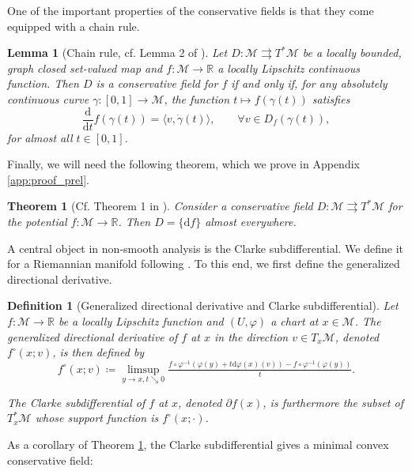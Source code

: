 \documentclass{article}
\newtheorem{definition}{Definition}
\newtheorem{lemma}{Lemma}
\newtheorem{theorem}{Theorem}
\newcommand{\CM}{\mathcal{M}}
\newcommand{\BR}{\mathbb{R}}
\newcommand{\rd}{\mathrm{d}}
\begin{document}
One of the important properties of the conservative fields is that they come equipped with a chain rule. 
\begin{lemma}[Chain rule, cf. Lemma 2 of \cite{bolte2021conservative}]\label{th:chain}
    Let $D: \CM\rightrightarrows T^*\CM$ be a locally bounded, graph closed set-valued map and $f: \CM\to\BR$ a locally Lipschitz continuous function. Then $D$ is a conservative field for $f$ if and only if, for any absolutely continuous curve $\gamma: [0,1]\to \CM$, the function $t\mapsto f(\gamma(t))$ satisfies
    \begin{equation}\label{eq:chainrule}
        \frac{\rd}{\rd t}f(\gamma(t))=\langle v,\dot\gamma(t)\rangle,\qquad \forall v\in D_f(\gamma(t)),
    \end{equation}
    for almost all $t\in [0,1]$. 
\end{lemma}



Finally, we will need the following theorem, which we prove in Appendix \ref{app:proof_prel}.
\begin{theorem}[Cf. Theorem 1 in \cite{bolte2021conservative}]\label{th:gradEverywhere}
Consider a conservative field $D: \CM\rightrightarrows T^*\CM$ for the potential $f:\CM\to\BR$. Then $D=\{\rd f\}$ almost everywhere. 
\end{theorem}

A central object in non-smooth analysis is the Clarke subdifferential. We define it for a Riemannian manifold following \cite{Hosseini2011Generalized}.  To this end, we first define the generalized directional derivative.

\begin{definition}[Generalized directional derivative and Clarke subdifferential]
    Let $f: \CM\to\BR$ be a locally Lipschitz function and $(U,\varphi)$ a chart at $x\in\CM$. The \emph{generalized directional derivative} of $f$ at $x$ in the direction $v\in T_x\CM$, denoted $f^\circ(x;v)$, is then defined by
    \begin{equation}
        f^\circ(x;v)\coloneqq \limsup_{y\to x, t\searrow 0}\tfrac{f\circ \varphi^{-1}(\varphi(y)+t\rd \varphi(x)(v))-f\circ\varphi^{-1}(\varphi(y))}{t}.
    \end{equation}

    The Clarke subdifferential of $f$ at $x$, denoted $\partial f(x)$, is furthermore the subset of $T^*_x\CM$ whose support function is $f^\circ(x;\cdot)$. 
\end{definition}

As a corollary of Theorem \ref{th:gradEverywhere}, the Clarke subdifferential gives a minimal convex conservative field:
\end{document}
